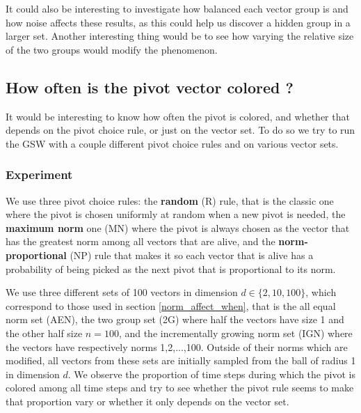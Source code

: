 \documentclass[12pt]{article}
\begin{document}
It could also be interesting to investigate how balanced each vector group is and how noise affects these results, as this could help us discover a hidden group in a larger set. Another interesting thing would be to see how varying the relative size of the two groups would modify the phenomenon. 

\subsection{How often is the pivot vector colored ?}\label{pivot_colored}
It would be interesting to know how often the pivot is colored, and whether that depends on the pivot choice rule, or just on the vector set. To do so we try to run the GSW with a couple different pivot choice rules and on various vector sets.
\subsubsection{Experiment}
We use three pivot choice rules: the \textbf{random} (R) rule, that is the classic one where the pivot is chosen uniformly at random when a new pivot is needed, the \textbf{maximum norm} one (MN) where the pivot is always chosen as the vector that has the greatest norm among all vectors that are alive, and the \textbf{norm-proportional} (NP) rule that makes it so each vector that is alive has a probability of being picked as the next pivot that is proportional to its norm. 

We use three different sets of 100 vectors in dimension $d\in\{2,10,100\}$, which correspond to those used in section \ref{norm_affect_when}, that is the all equal norm set (AEN), the two group set (2G) where half the vectors have size 1 and the other half size $n=100$, and the incrementally growing norm set (IGN) where the vectors have respectively norms 1,2,...,100. Outside of their norms which are modified, all vectors from these sets are initially sampled from the ball of radius 1 in dimension $d$. We observe the proportion of time steps during which the pivot is colored among all time steps and try to see whether the pivot rule seems to make that proportion vary or whether it only depends on the vector set.
\end{document}
